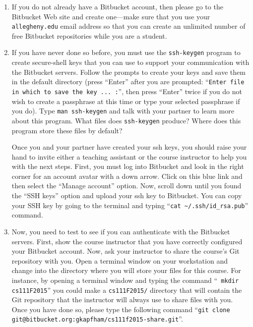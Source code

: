 \begin{enumerate}

  \item If you do not already have a Bitbucket account, then please go to the Bitbucket Web site and create one---make sure
    that you use your {\tt allegheny.edu} email address so that you can create an unlimited number of free Bitbucket
    repositories while you are a student.

  \item If you have never done so before, you must use the {\tt ssh-keygen} program to create secure-shell keys that you
    can use to support your communication with the Bitbucket servers. Follow the prompts to create your keys and save
    them in the default directory (press ``Enter'' after you are prompted: ``{\tt Enter file in which to save the key ...
    :}'', then press ``Enter'' twice if you do not wish to create a passphrase at this time or type your selected
    passphrase if you do).   Type {\tt man ssh-keygen} and talk with your partner to learn more about this program.
    What files does {\tt ssh-keygen} produce?  Where does this program store these files by default?

    Once you and your partner have created your ssh keys, you should raise your hand to invite either a teaching
    assistant or the course instructor to help you with the next steps. First, you must log into Bitbucket and look in the
    right corner for an account avatar with a down arrow.  Click on this blue link and then select the ``Manage
    account'' option. Now, scroll down until you found the ``SSH keys'' option and upload your ssh key to Bitbucket. You
    can copy your SSH key by going to the terminal and typing ``{\tt cat \textasciitilde{}/.ssh/id\_rsa.pub}'' command.

  \item Now, you need to test to see if you can authenticate with the Bitbucket servers.  First, show the course
    instructor that you have correctly configured your Bitbucket account.  Now, ask your instructor to share the
    course's Git repository with you.  Open a terminal window on your workstation and change into the directory where
    you will store your files for this course.  For instance, by opening a terminal window and typing the command ``{\tt
    mkdir cs111F2015}'' you could make a {\tt cs111F2015/} directory that will contain the Git repository that the
    instructor will always use to share files with you.  Once you have done so, please type the following command 
    ``{\tt git clone git@bitbucket.org:gkapfham/cs111f2015-share.git}''.


\end{enumerate}

